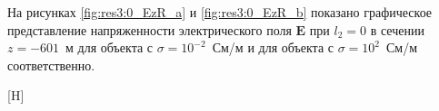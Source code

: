 \documentclass[a4paper,14pt]{article}
\makeatletter
\renewenvironment{figure}[1][\fps@figure]{
  \edef\@tempa{\noexpand\@float{figure}[#1]}
  \@tempa
  \addtocounter{foofigure}{1}
}{
  \end@float
}
\renewcommand{\Re}{\mathop{\mathrm{Re}}\nolimits}
\makeatother
\begin{document}
На рисунках \ref{fig:res3:0_EzR_a} и \ref{fig:res3:0_EzR_b} показано графическое представление напряженности электрического поля $\mathbf{E}$ при $l_2=0$ в сечении $z=-601$~м для объекта с $\sigma=10^{-2}$~См/м и для объекта с $\sigma=10^{2}$~См/м соответственно.

\begin{figure}[H]
	\centering
	\text{~~}
	\caption{$\Re(\mathbf{E}_z)$ при $l_2=0$}
	\label{fig:res3:0_EzR}
\end{figure}
\end{document}
